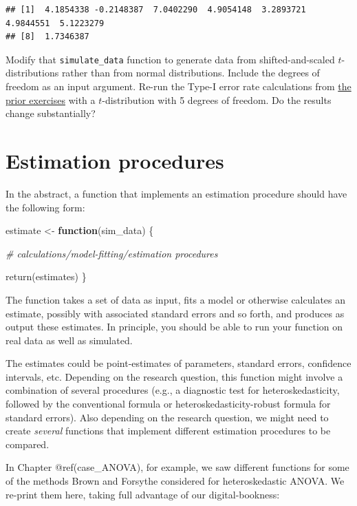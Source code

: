 \documentclass[
]{book}
\newenvironment{Shaded}{\begin{snugshade}}{\end{snugshade}}
\newcommand{\CommentTok}[1]{\textcolor[rgb]{0.56,0.35,0.01}{\textit{#1}}}
\newcommand{\ControlFlowTok}[1]{\textcolor[rgb]{0.13,0.29,0.53}{\textbf{#1}}}
\newcommand{\FunctionTok}[1]{\textcolor[rgb]{0.00,0.00,0.00}{#1}}
\newcommand{\NormalTok}[1]{#1}
\newcommand{\OtherTok}[1]{\textcolor[rgb]{0.56,0.35,0.01}{#1}}
\begin{document}
\begin{verbatim}
## [1]  4.1854338 -0.2148387  7.0402290  4.9054148  3.2893721  4.9844551  5.1223279
## [8]  1.7346387
\end{verbatim}

Modify that \texttt{simulate\_data} function to generate data from shifted-and-scaled \(t\)-distributions rather than from normal distributions. Include the degrees of freedom as an input argument.
Re-run the Type-I error rate calculations from \protect\hyperlink{exAnovaExercises}{the prior exercises} with a \(t\)-distribution with 5 degrees of freedom.
Do the results change substantially?

\hypertarget{estimation-procedures}{%
\chapter{Estimation procedures}\label{estimation-procedures}}

In the abstract, a function that implements an estimation procedure should have the following form:

\begin{Shaded}
\begin{Highlighting}[]
\NormalTok{estimate }\OtherTok{\textless{}{-}} \ControlFlowTok{function}\NormalTok{(sim\_data) \{}

  \CommentTok{\# calculations/model{-}fitting/estimation procedures}
  
  \FunctionTok{return}\NormalTok{(estimates)}
\NormalTok{\}}
\end{Highlighting}
\end{Shaded}

The function takes a set of data as input, fits a model or otherwise calculates an estimate, possibly with associated standard errors and so forth, and produces as output these estimates.
In principle, you should be able to run your function on real data as well as simulated.

The estimates could be point-estimates of parameters, standard errors, confidence intervals, etc.
Depending on the research question, this function might involve a combination of several procedures (e.g., a diagnostic test for heteroskedasticity, followed by the conventional formula or heteroskedasticity-robust formula for standard errors).
Also depending on the research question, we might need to create \emph{several} functions that implement different estimation procedures to be compared.

In Chapter @ref(case\_ANOVA), for example, we saw different functions for some of the methods Brown and Forsythe considered for heteroskedastic ANOVA.
We re-print them here, taking full advantage of our digital-bookness:
\end{document}

